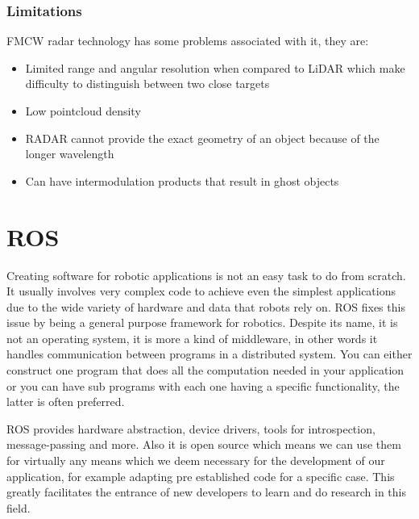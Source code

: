 \subsubsection{Limitations}
\ac{FMCW} {radar} technology has some problems associated with it, they are:
\begin{itemize}
\item{Limited range and angular resolution when compared to \ac{LiDAR} which make difficulty to distinguish between two close targets}  
\item{Low pointcloud density}  
\item{RADAR cannot provide the exact geometry of an object because of the longer wavelength}  
\item{Can have intermodulation products that result in ghost objects} 
\end{itemize}



\section {ROS}
Creating software for robotic applications is not an easy task to do from scratch. It usually involves very complex code to achieve even the simplest applications due to the wide variety of hardware and data that robots rely on. \ac{ROS} fixes this issue by being a general purpose framework for robotics. Despite its name, it is not an operating system, it is more a kind of middleware, in other words it  handles communication between programs in a distributed system. You can either construct one program that does all the computation needed in your application or you can have sub programs with each one having a specific functionality, the latter is often preferred.

\ac{ROS} provides hardware abstraction, device drivers, tools for introspection, message-passing and more. Also it is open source which means we can use them for virtually any means which we deem necessary for the development of our application, for example adapting pre established code for a specific case. This greatly facilitates the entrance of new developers to learn and do research in this field.
